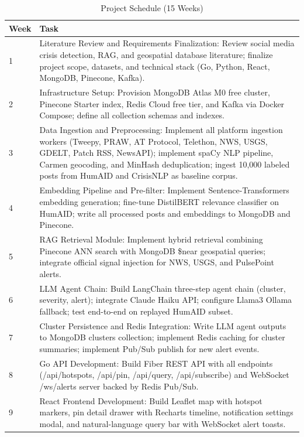 \documentclass[conference]{IEEEtran}
\begin{document}
\begin{table}[h]
\caption{Project Schedule (15 Weeks)}
\label{tab:schedule}
\renewcommand{\arraystretch}{1.3}
\begin{tabular}{p{0.8cm} p{6.6cm}}
\toprule
\textbf{Week} & \textbf{Task} \\
\midrule
1 & Literature Review and Requirements Finalization: Review social media crisis
detection, RAG, and geospatial database literature; finalize project scope,
datasets, and technical stack (Go, Python, React, MongoDB, Pinecone, Kafka). \\
2 & Infrastructure Setup: Provision MongoDB Atlas M0 free cluster, Pinecone
Starter index, Redis Cloud free tier, and Kafka via Docker Compose; define all
collection schemas and indexes. \\
3 & Data Ingestion and Preprocessing: Implement all platform ingestion workers
(Tweepy, PRAW, AT Protocol, Telethon, NWS, USGS, GDELT, Patch RSS, NewsAPI);
implement spaCy NLP pipeline, Carmen geocoding, and MinHash deduplication;
ingest 10,000 labeled posts from HumAID and CrisisNLP as baseline corpus. \\
4 & Embedding Pipeline and Pre-filter: Implement Sentence-Transformers embedding
generation; fine-tune DistilBERT relevance classifier on HumAID; write all
processed posts and embeddings to MongoDB and Pinecone. \\
5 & RAG Retrieval Module: Implement hybrid retrieval combining Pinecone ANN
search with MongoDB \$near geospatial queries; integrate official signal
injection for NWS, USGS, and PulsePoint alerts. \\
6 & LLM Agent Chain: Build LangChain three-step agent chain (cluster, severity,
alert); integrate Claude Haiku API; configure Llama3 Ollama fallback; test
end-to-end on replayed HumAID subset. \\
7 & Cluster Persistence and Redis Integration: Write LLM agent outputs to MongoDB
clusters collection; implement Redis caching for cluster summaries;
implement Pub/Sub publish for new alert events. \\
8 & Go API Development: Build Fiber REST API with all endpoints (/api/hotspots,
/api/pin, /api/query, /api/subscribe) and WebSocket /ws/alerts server backed
by Redis Pub/Sub. \\
9 & React Frontend Development: Build Leaflet map with hotspot markers, pin
detail drawer with Recharts timeline, notification settings modal, and
natural-language query bar with WebSocket alert toasts. \\

\end{tabular}
\end{table}
\end{document}
